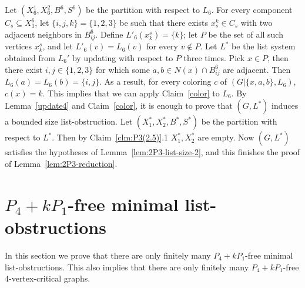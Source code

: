 \documentclass[11pt]{article}
\begin{document}
	Let $(X^1_6, X^2_6, B^6, S^6)$ be the partition with respect to $L_6$. 
For every component $C_s \subseteq X^6_1$,  let  $\{i,j,k\}=\{1,2,3\}$ be
such that there exists $x^k_s\in C_s$ with two adjacent neighbors in $B_{ij}^6$. Define  $L'_6(x_k^s)=\{k\}$; let $P$ be the set of all such vertices $x_k^s$, and   let $L'_6(v)=L_6(v)$ for every $v \not \in P$. Let $L^*$ be the list system 
obtained from $L_6'$ by  updating with respect to $P$ three times. Pick $x\in P$, then there exist $i,j \in \{1,2,3\}$ for which some $a,b\in N(x)\cap B_{ij}^6$
are adjacent. Then $L_6(a)=L_6(b)=\{i,j\}$. As a result, for every coloring $c$ of $(G|\{x,a,b\}, L_6)$, $c(x)=k$. This implies that we can apply Claim~\ref{color} to $L_6$. By Lemma~\ref{update4} and Claim~\ref{color},  it is enough to prove that $ (G,L^*) $ induces a bounded size list-obstruction. Let $(X^*_1, X^*_2, B^*, S^*)$ be the partition with respect to $L^*$. 
Then by Claim~\ref{clm:P3(2.5)}.1 $ X^*_1, X^*_2 $ are empty.  Now $(G,L^*)$ satisfies the hypotheses of Lemma~\ref{lem:2P3-list-size-2}, and this finishes the proof of Lemma~\ref{lem:2P3-reduction}.

\section{$P_4+k P_1$-free minimal list-obstructions}\label{sec:sufficiency-P4+kP1}

In this section we prove that there are only finitely many $P_4+k P_1$-free minimal list-obstructions.
This also implies that there are only finitely many $P_4+k P_1$-free 4-vertex-critical graphs.
\end{document}
